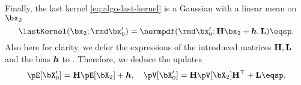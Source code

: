 Finally, the last kernel \eqref{eq:algo-last-kernel} is a Gaussian with a linear mean on $\bx_2$
\begin{equation*}
    \lastKernel(\bx_2; \rmd \bx_0') = \normpdf(\rmd \bx_0'; \LH \bx_2 + \Lbias, \Lcov)
    \eqsp.
\end{equation*}
Also here for clarity, we defer the expressions of the introduced matrices $\mathbf{H}, \mathbf{L}$ and the bias  $\boldsymbol{h}$ to .
Therefore, we deduce the updates
\begin{equation}
    \label{eq:last-kernel-gauss}
    \pE[\bX_0'] = \LH \pE[\bX_2] + \Lbias,
    \quad
    \pV[\bX_0'] = \LH \pV[\bX_2] \LH^\top + \Lcov
    \eqsp.
\end{equation}

